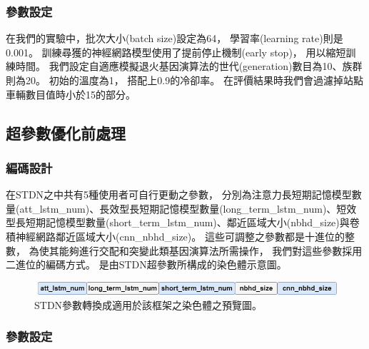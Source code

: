 \documentclass[a4paper,14pt]{extarticle}
\begin{document}
            \subsubsection{參數設定}
                \label{subsubsec:parameters_setting}
                在我們的實驗中，批次大小(batch size)設定為64，
                學習率(learning rate)則是0.001。
                訓練尋獲的神經網路模型使用了提前停止機制(early stop)，
                用以縮短訓練時間。
                我們設定自適應模擬退火基因演算法的世代(generation)數目為10、族群則為20。
                初始的溫度為1，
                搭配上0.9的冷卻率。
                在評價結果時我們會過濾掉站點車輛數目值時小於15的部分。

            \subsection{超參數優化前處理}
                \subsubsection{編碼設計}

                    在STDN之中共有5種使用者可自行更動之參數，
                    分別為注意力長短期記憶模型數量(att\_lstm\_num)、長效型長短期記憶模型數量(long\_term\_lstm\_num)、短效型長短期記憶模型數量(short\_term\_lstm\_num)、鄰近區域大小(nbhd\_size)與卷積神經網路鄰近區域大小(cnn\_nbhd\_size)。
                    這些可調整之參數都是十進位的整數，
                    為使其能夠進行交配和突變此類基因演算法所需操作，
                    我們對這些參數採用二進位的編碼方式。
                    是由STDN超參數所構成的染色體示意圖。
                    \begin{figure}[htbp]
                        \centering
                        \includegraphics[width=\textwidth]{chromosome_sheme.png}
                        \caption{
                            {\fontsize{12pt}{10pt}\selectfont
                                STDN參數轉換成適用於該框架之染色體之預覽圖。
                            }
                        }
                        \label{fig:chromosome_sheme}
                    \end{figure}

                \subsubsection{參數設定}
\end{document}
